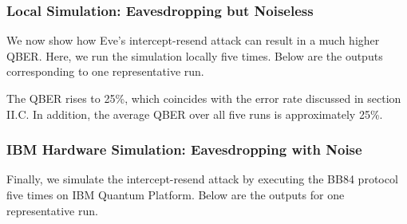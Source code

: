 \subsubsection{Local Simulation: Eavesdropping but Noiseless}

We now show how Eve's intercept-resend attack can result in a much higher QBER. Here, we run the simulation locally five times. 
Below are the outputs corresponding to one representative run.

\noindent
{}

The QBER rises to 25\%, which coincides with the error rate discussed in section II.C. In addition, the average QBER over all five runs is approximately 25\%.


\subsubsection{IBM Hardware Simulation: Eavesdropping with Noise}

Finally, we simulate the intercept-resend attack by executing the BB84 protocol five times on IBM Quantum Platform.
Below are the outputs for one representative run.

